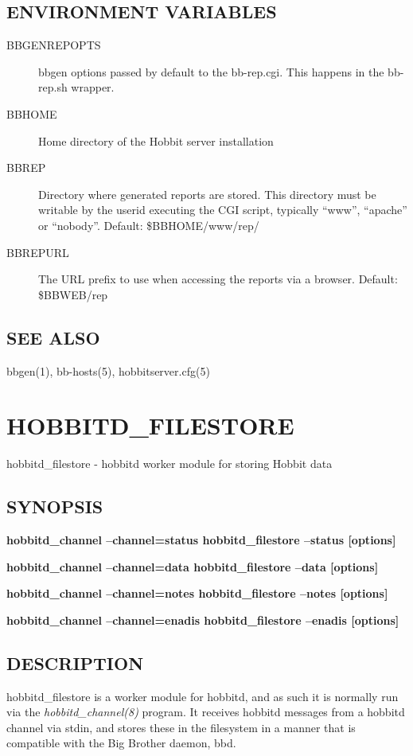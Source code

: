 \subsection{ENVIRONMENT VARIABLES}
\begin{description}
\item[BBGENREPOPTS] bbgen options passed by default to the bb-rep.cgi. This happens in the bb-rep.sh wrapper. 
\item[BBHOME] Home directory of the Hobbit server installation 
\item[BBREP] Directory where generated reports are stored. This directory must be writable by the userid executing the CGI script, typically ``www'', ``apache'' or ``nobody''. Default: \$BBHOME/www/rep/ 
\item[BBREPURL] The URL prefix to use when accessing the reports via a browser. Default: \$BBWEB/rep 


\end{description}
\subsection{SEE ALSO}
bbgen(1), bb-hosts(5), hobbitserver.cfg(5) 

 


  
%
%
\newpage
\section{HOBBITD\_FILESTORE}

 hobbitd\_filestore - hobbitd worker module for storing Hobbit data \subsection{SYNOPSIS}
\textbf{hobbitd\_channel --channel=status hobbitd\_filestore --status [options]}
 
\textbf{hobbitd\_channel --channel=data hobbitd\_filestore --data [options]}
 
\textbf{hobbitd\_channel --channel=notes hobbitd\_filestore --notes [options]}
 
\textbf{hobbitd\_channel --channel=enadis hobbitd\_filestore --enadis [options]}


 
\subsection{DESCRIPTION}
 hobbitd\_filestore is a worker module for hobbitd, and as such it is normally run via the \emph{hobbitd\_channel(8)}
 program. It receives hobbitd messages from a hobbitd channel via stdin, and stores these in the filesystem in a manner that is compatible with the Big Brother daemon, bbd. 

